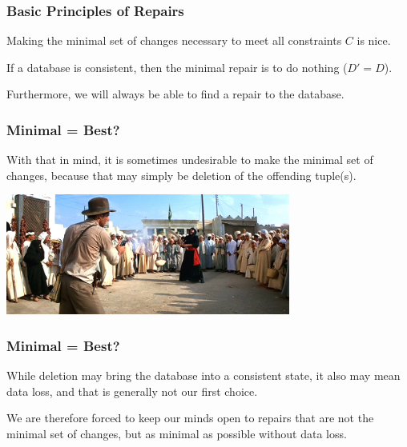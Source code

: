 \begin{frame}
\frametitle{Basic Principles of Repairs}
Making the minimal set of changes necessary to meet all constraints $C$ is nice.


If a database is consistent, then the minimal repair is to do nothing ($D' = D$). 

Furthermore, we will always be able to find a repair to the database.

\end{frame}




\begin{frame}
\frametitle{Minimal = Best?}

With that in mind, it is sometimes undesirable to make the minimal set of changes, because that may simply be deletion of the offending tuple(s). 

\begin{center}
	\includegraphics[width=0.7\textwidth]{images/indy.jpg}
\end{center}

\end{frame}

\begin{frame}
\frametitle{Minimal = Best?}

While deletion may bring the database into a consistent state, it also may mean data loss, and that is generally not our first choice. 

We are therefore forced to keep our minds open to repairs that are not the minimal set of changes, but as minimal as possible without data loss.


\end{frame}


